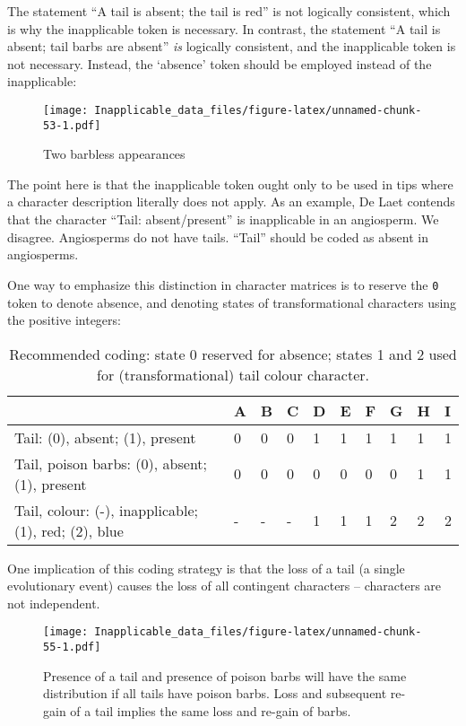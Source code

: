 \documentclass[]{book}
\theoremstyle{definition}
\theoremstyle{definition}
\theoremstyle{definition}
\theoremstyle{remark}
\begin{document}
The statement ``A tail is absent; the tail is red'' is not logically
consistent, which is why the inapplicable token is necessary. In
contrast, the statement ``A tail is absent; tail barbs are absent''
\emph{is} logically consistent, and the inapplicable token is not
necessary. Instead, the `absence' token should be employed instead of
the inapplicable:

\begin{figure}
\centering
\texttt{[image: Inapplicable\_data\_files/figure-latex/unnamed-chunk-53-1.pdf]}
\caption{\label{fig:unnamed-chunk-53}Two barbless appearances}
\end{figure}

The point here is that the inapplicable token ought only to be used in
tips where a character description literally does not apply. As an
example, De Laet \citeyearpar{DeLaet2017} contends that the character
``Tail: absent/present'' is inapplicable in an angiosperm. We disagree.
Angiosperms do not have tails. ``Tail'' should be coded as absent in
angiosperms.

One way to emphasize this distinction in character matrices is to
reserve the \texttt{0} token to denote absence, and denoting states of
transformational characters using the positive integers:

\begin{table}

\caption{\label{tab:unnamed-chunk-54}Recommended coding: state 0 reserved for absence; states 1 and 2 used for (transformational) tail colour character.}
\centering
\begin{tabular}[t]{l|l|l|l|l|l|l|l|l|l}
\hline
  & A & B & C & D & E & F & G & H & I\\
\hline
Tail: (0), absent; (1), present & 0 & 0 & 0 & 1 & 1 & 1 & 1 & 1 & 1\\
\hline
Tail, poison barbs: (0), absent; (1), present & 0 & 0 & 0 & 0 & 0 & 0 & 0 & 1 & 1\\
\hline
Tail, colour: (-), inapplicable; (1), red; (2), blue & - & - & - & 1 & 1 & 1 & 2 & 2 & 2\\
\hline
\end{tabular}
\end{table}

One implication of this coding strategy is that the loss of a tail (a
single evolutionary event) causes the loss of all contingent characters
-- characters are not independent.

\begin{figure}
\centering
\texttt{[image: Inapplicable\_data\_files/figure-latex/unnamed-chunk-55-1.pdf]}
\caption{\label{fig:unnamed-chunk-55}Presence of a tail and presence of
poison barbs will have the same distribution if all tails have poison
barbs. Loss and subsequent re-gain of a tail implies the same loss and
re-gain of barbs.}
\end{figure}
\end{document}
